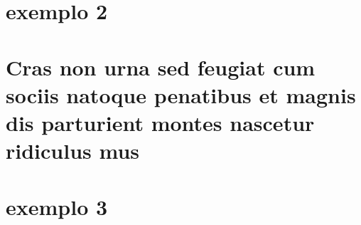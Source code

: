 \documentclass[
	12pt,				%
	openany,			%
	twoside,			%
	a4paper,			%
	english,			%
	brazil				%
	]{abntex2}
\begin{document}

\begin{anexosenv}

\partanexos

\chapter{exemplo 2}
\lipsum[30]

\chapter{Cras non urna sed feugiat cum sociis natoque penatibus et magnis dis
parturient montes nascetur ridiculus mus}

\lipsum[31]

\chapter{exemplo 3}

\lipsum[32]

\end{anexosenv}

\printindex
\end{document}
